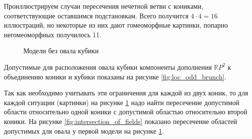 \documentclass[14pt]{article}
\begin{document}
Проиллюстрируем случаи пересечения нечетной ветви с кониками, соответствующие оставшимся подстановкам. Всего получится $4 \cdot 4 = 16$ иллюстраций, но некоторые из них дают гомеоморфные картинки, попарно негомеоморфных получилось 11. 

\begin{figure}[H]
\caption{Модели без овала кубики}
\label{fig:curves_without_ovals}
\end{figure}

Допустимые для расположения овала кубики компоненты дополнения $\mathbb RP^2$ к объединению коники и кубики показаны на рисунке \ref{fig:loc_odd_brunch}.

Так как необходимо учитывать эти ограничения для каждой из двух коник, то для каждой ситуации (картинки) на рисунке \ref{fig:curves_without_ovals} надо найти пересечение допустимой области относительно одной коники с допустимой областью относительно второй коники. На рисунке \ref{fig:intersection_of_fields} показано пересечение областей допустимых для овала у первой модели на рисунке \ref{fig:curves_without_ovals}.
\end{document}
